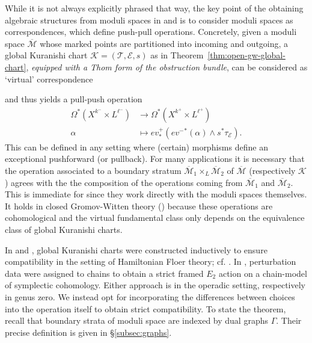 \documentclass[11pt,psamsfonts, oneside, reqno]{amsart}
\newcommand{\eva}{ev}
\newcommand{\Mbar}{\overline{\mathcal M}}
\newcommand{\cE}{\mathcal{E}}
\newcommand{\cK}{\mathcal{K}}
\newcommand{\cT}{\mathcal{T}}
\theoremstyle{definition}
\theoremstyle{remark}
\numberwithin{equation}{section}
\begin{document}
\noindent
While it is not always explicitly phrased that way, the key point of the obtaining algebraic structures from moduli spaces in \cite{Fu10} and \cite{ST23} is to consider moduli spaces as correspondences, which define push-pull operations. Concretely, given a moduli space $\Mbar$ whose marked points are partitioned into incoming and outgoing, a global Kuranishi chart $\cK = (\cT,\cE,s)$ as in Theorem~\ref{thm:open-gw-global-chart}, \emph{equipped with a Thom form of the obstruction bundle}, can be considered as `virtual' correspondence 
\begin{center} \end{center}
and thus yields a pull-push operation
\begin{align*}\label{}
	\Omega^*(X^{k^-}\times L^{\ell^-}) &\to \Omega^*(X^{k^+}\times L^{\ell^+})\\
	\alpha &\mapsto \eva^+_*({\eva^-}^*(\alpha)\wedge s^*\tau_{\cE}).
\end{align*}
This can be defined in any setting where (certain) morphisms define an exceptional pushforward (or pullback). For many applications it is necessary that the operation associated to a boundary stratum $\Mbar_1\times_L \Mbar_2$ of $\Mbar$ (respectively $\cK$) agrees with the the composition of the operations coming from $\Mbar_1$ and $\Mbar_2$. This is immediate for \cite{ST16} since they work directly with the moduli spaces themselves. It holds in closed Gromov-Witten theory (\cite{Hir23}) because these operations are cohomological and the virtual fundamental class only depends on the equivalence class of global Kuranishi charts.
 
In \cite{BX22} and \cite{Rez22}, global Kuranishi charts were constructed inductively to ensure compatibility in the setting of Hamiltonian Floer theory; cf. \cite{AB24}. 
In \cite{AGV24}, perturbation data were assigned to chains to obtain a strict framed $E_2$ action on a chain-model of symplectic cohomology. 
Either approach is in the operadic setting, respectively in genus zero. We instead opt for incorporating the differences between choices into the operation itself to obtain strict compatibility. 
To state the theorem, recall that boundary strata of moduli space are indexed by dual graphs $\Gamma$. Their precise definition is given in \S\ref{subsec:graphs}. 
\end{document}
